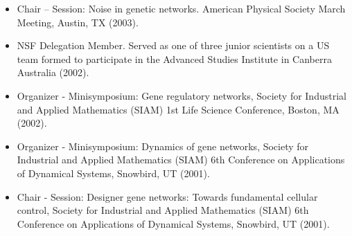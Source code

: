 \documentclass[11pt,a4paper,sans]{moderncv}        %
\begin{document}
\begin{itemize}
\item Chair -- Session: Noise in genetic networks. American Physical
Society March Meeting, Austin, TX (2003).
\item NSF Delegation Member. Served as one of three junior scientists
on a US team formed to participate in the Advanced Studies
Institute in Canberra Australia (2002).
\item Organizer - Minisymposium: Gene regulatory networks, Society for Industrial
and Applied Mathematics (SIAM) 1st Life Science Conference,
Boston, MA (2002).
\item Organizer - Minisymposium: Dynamics of gene networks, Society for Industrial and
Applied Mathematics (SIAM) 6th Conference on Applications of
Dynamical Systems, Snowbird, UT (2001).
\item Chair - Session: Designer gene networks: Towards fundamental cellular control,
Society for Industrial and Applied Mathematics (SIAM) 6th
Conference on Applications of Dynamical Systems, Snowbird, UT
(2001).
\end{itemize}
\end{document}
